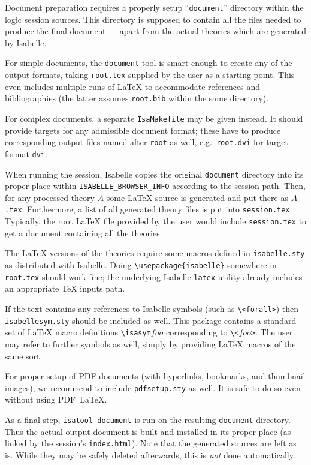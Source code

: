 \medskip Document preparation requires a properly setup ``\texttt{document}''
directory within the logic session sources.  This directory is supposed to
contain all the files needed to produce the final document --- apart from the
actual theories which are generated by Isabelle.

\medskip For simple documents, the \texttt{document} tool is smart enough to
create any of the output formats, taking \texttt{root.tex} supplied by the
user as a starting point.  This even includes multiple runs of {\LaTeX} to
accommodate references and bibliographies (the latter assumes
\texttt{root.bib} within the same directory).

For complex documents, a separate \texttt{IsaMakefile} may be given instead.
It should provide targets for any admissible document format; these have to
produce corresponding output files named after \texttt{root} as well, e.g.\ 
\texttt{root.dvi} for target format \texttt{dvi}.

\medskip When running the session, Isabelle copies the original
\texttt{document} directory into its proper place within
\texttt{ISABELLE_BROWSER_INFO} according to the session path.  Then, for any
processed theory $A$ some {\LaTeX} source is generated and put there as
$A$\texttt{.tex}.  Furthermore, a list of all generated theory files is put
into \texttt{session.tex}.  Typically, the root {\LaTeX} file provided by the
user would include \texttt{session.tex} to get a document containing all the
theories.

The {\LaTeX} versions of the theories require some macros defined in
\texttt{isabelle.sty} as distributed with Isabelle.  Doing
\verb,\usepackage{isabelle}, somewhere in \texttt{root.tex} should work fine;
the underlying Isabelle \texttt{latex} utility already includes an appropriate
{\TeX} inputs path.

If the text contains any references to Isabelle symbols (such as
\verb,\<forall>,) then \texttt{isabellesym.sty} should be included as well.
This package contains a standard set of {\LaTeX} macro definitions
\verb,\isasym,$foo$ corresponding to \verb,\<,$foo$\verb,>,.  The user may
refer to further symbols as well, simply by providing {\LaTeX} macros of the
same sort.

For proper setup of PDF documents (with hyperlinks, bookmarks, and thumbnail
images), we recommend to include \verb,pdfsetup.sty, as well.  It is safe to
do so even without using PDF~\LaTeX.

\medskip As a final step, \texttt{isatool document} is run on the resulting
\texttt{document} directory.  Thus the actual output document is built and
installed in its proper place (as linked by the session's
\texttt{index.html}).  Note that the generated sources are left as is.  While
they may be safely deleted afterwards, this is \emph{not} done automatically.


